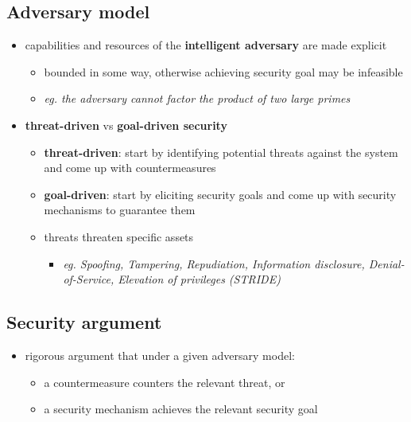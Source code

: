 \documentclass[12pt,titlepage,a4paper]{report}
\begin{document}
			\subsection{Adversary model}
				\begin{itemize}
					\item capabilities and resources of the \textbf{intelligent adversary} are made explicit
					\begin{itemize}
						\item bounded in some way, otherwise achieving security goal may be infeasible
						\item \emph{eg. the adversary cannot factor the product of two large primes}
					\end{itemize}
					\item \textbf{threat-driven} vs \textbf{goal-driven security}
					\begin{itemize}
						\item \textbf{threat-driven}: start by identifying potential threats against the system and come up with countermeasures
						\item \textbf{goal-driven}: start by eliciting security goals and come up with security mechanisms to guarantee them
						\item threats threaten specific assets
						\begin{itemize}
							\item \emph{eg. Spoofing, Tampering, Repudiation, Information disclosure, Denial-of-Service, Elevation of privileges (STRIDE)}
						\end{itemize}
					\end{itemize}
				\end{itemize}

			\subsection{Security argument}
				\begin{itemize}
					\item rigorous argument that under a given adversary model:
					\begin{itemize}
						\item a countermeasure counters the relevant threat, or
						\item a security mechanism achieves the relevant security goal
					\end{itemize}
				\end{itemize}
\end{document}
